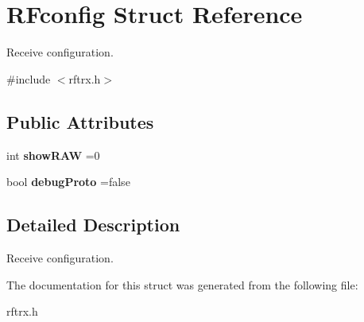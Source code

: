 \hypertarget{struct_r_fconfig}{}\section{R\+Fconfig Struct Reference}
\label{struct_r_fconfig}


Receive configuration.  




{\ttfamily \#include $<$rftrx.\+h$>$}

\subsection*{Public Attributes}
\begin{DoxyCompactItemize}
\item 
\mbox{\label{struct_r_fconfig_a012eec56991e81d6dd02a03e7d077e16}} 
int {\bfseries show\+R\+AW} =0
\item 
\mbox{\label{struct_r_fconfig_abfe7749383476e75c096f8e61927728d}} 
bool {\bfseries debug\+Proto} =false
\end{DoxyCompactItemize}


\subsection{Detailed Description}
Receive configuration. 

The documentation for this struct was generated from the following file\+:\begin{DoxyCompactItemize}
\item 
rftrx.\+h\end{DoxyCompactItemize}

